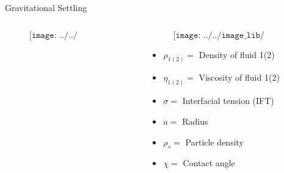 \documentclass{beamer}
\begin{document}

\begin{frame}{Gravitational Settling}
  \begin{columns}[t]
 
    \begin{column}{0.5\paperwidth}
      \centering
      \vspace{-1cm}
      \begin{figure}
        $$\texttt{[image: ../../image\_lib/grav\_settle.png]}$$
      \end{figure}

    \end{column}

    \begin{column}{0.5\paperwidth}
      \vspace{-1.5cm}
      \begin{figure}
        $$\texttt{[image: ../../image\_lib/physical\_formulation(2).png]}$$
      \end{figure}
      \vspace{-1cm}
      \begin{itemize}
        \item $\rho_{1(2)} =$ Density of fluid 1(2)
        \item $\eta_{1(2)} =$ Viscosity of fluid 1(2)
        \item $\sigma =$ Interfacial tension (IFT)
        \item $a =$ Radius
        \item $\rho_{s} =$ Particle density
        \item $\chi =$ Contact angle
      \end{itemize}

    \end{column}
  \end{columns}
\end{frame}
\end{document}
